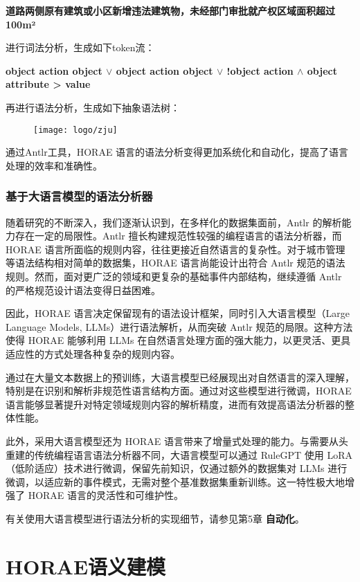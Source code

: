 \textbf{道路两侧原有建筑或小区新增违法建筑物，未经部门审批就产权区域面积超过100m²}

进行词法分析，生成如下token流：

\textbf{object action object $\lor$ object action object $\lor$ !object action $\land$ object attribute > value}


再进行语法分析，生成如下抽象语法树：

\begin{figure}[ht]
    \centering
    \texttt{[image: logo/zju]}
\end{figure}

通过Antlr工具，HORAE 语言的语法分析变得更加系统化和自动化，提高了语言处理的效率和准确性。

\subsubsection{基于大语言模型的语法分析器}

随着研究的不断深入，我们逐渐认识到，在多样化的数据集面前，Antlr 的解析能力存在一定的局限性。Antlr 擅长构建规范性较强的编程语言的语法分析器，而 HORAE 语言所面临的规则内容，往往更接近自然语言的复杂性。对于城市管理等语法结构相对简单的数据集，HORAE 语言尚能设计出符合 Antlr 规范的语法规则。然而，面对更广泛的领域和更复杂的基础事件内部结构，继续遵循 Antlr 的严格规范设计语法变得日益困难。

因此，HORAE 语言决定保留现有的语法设计框架，同时引入大语言模型（Large Language Models, LLMs）进行语法解析，从而突破 Antlr 规范的局限。这种方法使得 HORAE 能够利用 LLMs 在自然语言处理方面的强大能力，以更灵活、更具适应性的方式处理各种复杂的规则内容。

通过在大量文本数据上的预训练，大语言模型已经展现出对自然语言的深入理解，特别是在识别和解析非规范性语言结构方面。通过对这些模型进行微调，HORAE 语言能够显著提升对特定领域规则内容的解析精度，进而有效提高语法分析器的整体性能。

此外，采用大语言模型还为 HORAE 语言带来了增量式处理的能力。与需要从头重建的传统编程语言语法分析器不同，大语言模型可以通过 RuleGPT 使用 LoRA（低阶适应）技术进行微调，保留先前知识，仅通过额外的数据集对 LLMs 进行微调，以适应新的事件模式，无需对整个基准数据集重新训练。这一特性极大地增强了 HORAE 语言的灵活性和可维护性。

有关使用大语言模型进行语法分析的实现细节，请参见第5章 \textbf{自动化}。

\cleardoublepage

\section{HORAE语义建模}


